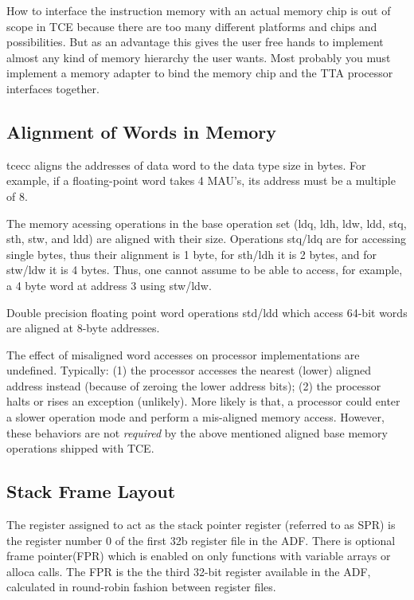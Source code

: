 \documentclass[twoside]{tceusermanual}
\begin{document}
How to interface the instruction memory with an actual memory chip is out of
scope in TCE because there are too many different platforms and chips and
possibilities. But as an advantage this gives the user free hands to
implement almost any kind of memory hierarchy the user wants. Most probably
you must implement a memory adapter to bind the memory chip and the TTA
processor interfaces together.

\subsection{Alignment of Words in Memory}
\label{ssec:align-conventions}

tcecc aligns the addresses of data word to the data type size in bytes.
For example, if a floating-point word takes 4 MAU's, its address must be 
a multiple of 8. 

The memory acessing operations in the base operation set (ldq, ldh, ldw,
ldd, stq, sth, stw, and ldd) are aligned with their size. Operations stq/ldq
are for accessing single bytes, thus their alignment is 1 byte, 
for sth/ldh it is 2 bytes, and for stw/ldw it is 4 bytes. Thus, one cannot 
assume to be able to access, for example, a 4 byte word at address 3
using stw/ldw.

Double precision floating point word operations std/ldd which access
64-bit words are aligned at 8-byte addresses. 

The effect of misaligned word accesses on processor implementations are
undefined. Typically: (1) the processor accesses the nearest (lower) aligned
address instead (because of zeroing the lower address bits); (2) the processor 
halts or rises an exception (unlikely). More likely is that, a processor 
could enter a slower operation mode and perform a mis-aligned memory access.
However, these behaviors are not \textit{required} by the above mentioned 
aligned base memory operations shipped with TCE.

\subsection{Stack Frame Layout}
\label{sec:stack-layout}

The register assigned to act as the stack pointer register (referred to as 
SPR) is the register number 0 of the first 32b register file in the ADF. 
There is optional frame pointer(FPR) which is enabled on only functions with
variable arrays or alloca calls. The FPR is the the third 32-bit register
available in the ADF, calculated in round-robin fashion between register files.
\end{document}
